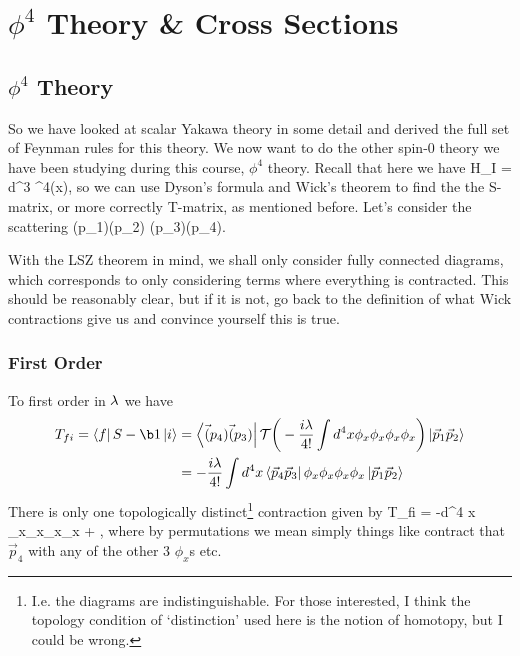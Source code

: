 \chapter{$\phi^4$ Theory \& Cross Sections}

\section{$\phi^4$ Theory}

So we have looked at scalar Yakawa theory in some detail and derived the full set of Feynman rules for this theory. We now want to do the other spin-$0$ theory we have been studying during this course, $\phi^4$ theory. Recall that here we have
\bse 
    H_I = \int d^3  \phi^4(x),
\ese 
so we can use Dyson's formula and Wick's theorem to find the the S-matrix, or more correctly T-matrix, as mentioned before. Let's consider the scattering
\bse 
    \phi(p_1)\phi(p_2) \to \phi(p_3)\phi(p_4).
\ese 

\br 
    With the LSZ theorem in mind, we shall only consider fully connected diagrams, which corresponds to only considering terms where everything is contracted. This should be reasonably clear, but if it is not, go back to the definition of what Wick contractions give us and convince yourself this is true.
\er 

\subsection{First Order}

To first order in $\lambda$ we have
\begin{equation*}
    \begin{split}
        T_{fi} = \bra{f} S-\b1 \ket{i} & = \bra{\vec(p_4)\vec(p_3)} \cT \bigg( -\frac{i\l}{4!}\int d^4 x \phi_x\phi_x\phi_x\phi_x \bigg)\ket{\vec{p}_1\vec{p}_2} \\
        & =  -\frac{i\l}{4!}\int d^4 x \bra{\vec{p}_4\vec{p}_3} \phi_x\phi_x\phi_x\phi_x \ket{\vec{p}_1\vec{p}_2}
    \end{split}
\end{equation*}
There is only one topologically distinct\footnote{I.e. the diagrams are indistinguishable. For those interested, I think the topology condition of `distinction' used here is the notion of homotopy, but I could be wrong.} contraction given by 
\bse 
    T_{fi} = -\int d^4 x  
     \phi_x\phi_x\phi_x\phi_x  + ,
\ese 
where by permutations we mean simply things like contract that $\vec{p}_4$ with any of the other 3 $\phi_x$s etc. 

